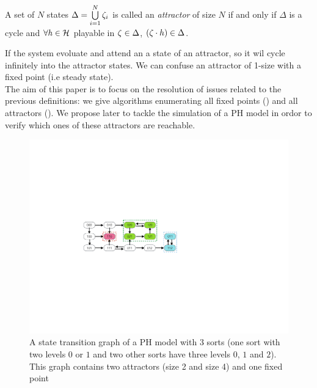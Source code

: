 \begin{definition}[Attractor]
\label{def:attractor}
A set of $N$ states $\Delta = \bigcup\limits_{i=1}^{N} \zeta_{i}$ is called an \emph{attractor} of size $N$ if and only if $\Delta$ is a cycle and $\forall h \in \mathcal{H} $ playable in $\zeta \in \Delta$, $(\zeta \cdot h) \in \Delta$.
\end{definition}

If the system evoluate and attend an a state of an attractor, so it wil cycle infinitely into the attractor states.
We can confuse an attractor of 1-size with a fixed point (i.e steady state). \\

The aim of this paper is to focus on the resolution of issues related to the previous definitions:
we give algorithms enumerating all fixed points ()
and all attractors (). We propose later to tackle the simulation of a PH model in ordor to verify which ones of these attractors are reachable.

\begin{figure}[h]
   \caption{\label{fig:transition-graph} A state transition graph of a PH model with 3 sorts (one sort with two levels $0$ or $1$ and two other sorts have three levels $0$, $1$ and $2$). This graph contains two attractors (size 2 and size 4) and one fixed point}
   \includegraphics{figures/transition-graph.pdf}
\end{figure}
